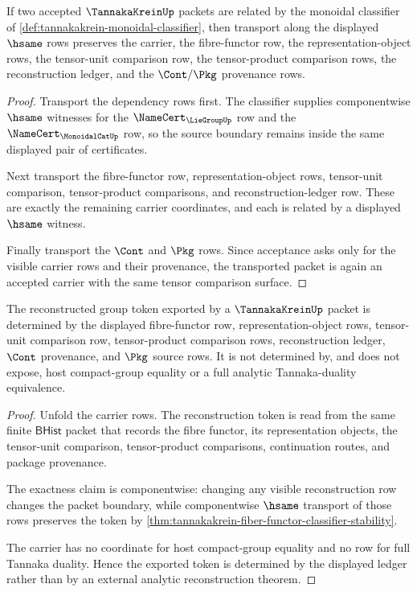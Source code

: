 \begin{theorem}
\label{thm:tannakakrein-fiber-functor-classifier-stability}
If two accepted $\TannakaKreinUp$ packets are related by the monoidal
classifier of \autoref{def:tannakakrein-monoidal-classifier}, then transport
along the displayed $\hsame$ rows preserves the carrier, the fibre-functor
row, the representation-object rows, the tensor-unit comparison row, the
tensor-product comparison rows, the reconstruction ledger, and the
$\Cont/\Pkg$ provenance rows.
\end{theorem}
\begin{proof}
Transport the dependency rows first. The classifier supplies componentwise
$\hsame$ witnesses for the $\NameCert_{\LieGroupUp}$ row and the
$\NameCert_{\MonoidalCatUp}$ row, so the source boundary remains inside the
same displayed pair of certificates.

Next transport the fibre-functor row, representation-object rows, tensor-unit
comparison, tensor-product comparisons, and reconstruction-ledger row. These
are exactly the remaining carrier coordinates, and each is related by a
displayed $\hsame$ witness.

Finally transport the $\Cont$ and $\Pkg$ rows. Since acceptance asks only for
the visible carrier rows and their provenance, the transported packet is again
an accepted carrier with the same tensor comparison surface.
\end{proof}

\begin{theorem}
\label{thm:tannakakrein-reconstruction-ledger-exactness}
The reconstructed group token exported by a $\TannakaKreinUp$ packet is
determined by the displayed fibre-functor row, representation-object rows,
tensor-unit comparison row, tensor-product comparison rows, reconstruction
ledger, $\Cont$ provenance, and $\Pkg$ source rows. It is not determined by,
and does not expose, host compact-group equality or a full analytic
Tannaka-duality equivalence.
\end{theorem}
\begin{proof}
Unfold the carrier rows. The reconstruction token is read from the same finite
$\mathsf{BHist}$ packet that records the fibre functor, its representation
objects, the tensor-unit comparison, tensor-product comparisons, continuation
routes, and package provenance.

The exactness claim is componentwise: changing any visible reconstruction row
changes the packet boundary, while componentwise $\hsame$ transport of those
rows preserves the token by
\autoref{thm:tannakakrein-fiber-functor-classifier-stability}.

The carrier has no coordinate for host compact-group equality and no row for
full Tannaka duality. Hence the exported token is determined by the displayed
ledger rather than by an external analytic reconstruction theorem.
\end{proof}

